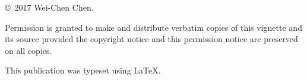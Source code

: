 
\null
\vfill
\copyright\ 2017 Wei-Chen Chen.

Permission is granted to make and distribute verbatim copies of
this vignette and its source provided the copyright notice and
this permission notice are preserved on all copies.

This publication was typeset using \LaTeX.
